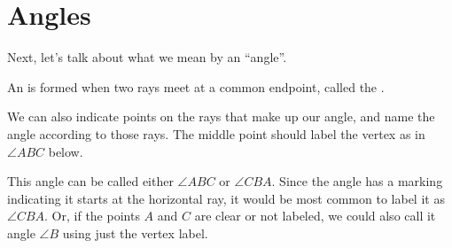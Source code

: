\documentclass{ximera}
\begin{document}
\section{Angles}

Next, let's talk about what we mean by an ``angle''.

\begin{definition}
An   is formed when two rays meet at a common endpoint, called the .
\begin{image}
\end{image}
\end{definition}

%
%
%
%

We can also indicate points on the rays that make up our angle, and name the angle according to those rays. The middle point should label the vertex as in $\angle ABC$ below.
\begin{image}
\end{image}
This angle can be called either $\angle ABC$ or $\angle CBA$. Since the angle has a marking indicating it starts at the horizontal ray, it would be most common to label it as $\angle CBA$. Or, if the points $A$ and $C$ are clear or not labeled, we could also call it angle $\angle B$ using just the vertex label.
\end{document}
